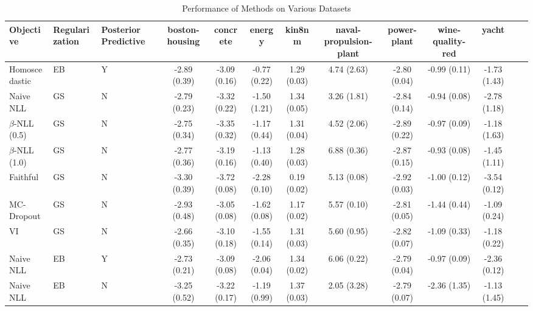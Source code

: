\begin{table}
\centering
\caption{Performance of Methods on Various Datasets}
\label{tab:results}
\begin{tabular}{|l|l|l|c|c|c|c|c|c|c|c|c|c|}
\toprule
        Objective & Regularization & Posterior Predictive & boston-housing &     concrete &       energy &      kin8nm & naval-propulsion-plant &  power-plant & wine-quality-red &        yacht \\
\midrule
    Homoscedastic &             EB &                    Y &   -2.89 (0.39) & -3.09 (0.16) & -0.77 (0.22) & 1.29 (0.03) &            4.74 (2.63) & -2.80 (0.04) &     -0.99 (0.11) & -1.73 (1.43) \\
        Naive NLL &             GS &                    N &   -2.79 (0.23) & -3.32 (0.22) & -1.50 (1.21) & 1.34 (0.05) &            3.26 (1.81) & -2.84 (0.14) &     -0.94 (0.08) & -2.78 (1.18) \\
$\beta$-NLL (0.5) &             GS &                    N &   -2.75 (0.34) & -3.35 (0.32) & -1.17 (0.44) & 1.31 (0.04) &            4.52 (2.06) & -2.89 (0.22) &     -0.97 (0.09) & -1.18 (1.63) \\
$\beta$-NLL (1.0) &             GS &                    N &   -2.77 (0.36) & -3.19 (0.16) & -1.13 (0.40) & 1.28 (0.03) &            6.88 (0.36) & -2.87 (0.15) &     -0.93 (0.08) & -1.45 (1.11) \\
         Faithful &             GS &                    N &   -3.30 (0.39) & -3.72 (0.08) & -2.28 (0.10) & 0.19 (0.02) &            5.13 (0.08) & -2.92 (0.03) &     -1.00 (0.12) & -3.54 (0.12) \\
       MC-Dropout &             GS &                    N &   -2.93 (0.48) & -3.05 (0.08) & -1.62 (0.08) & 1.17 (0.02) &            5.57 (0.10) & -2.81 (0.05) &     -1.44 (0.44) & -1.09 (0.24) \\
               VI &             GS &                    N &   -2.66 (0.35) & -3.10 (0.18) & -1.55 (0.14) & 1.31 (0.03) &            5.60 (0.95) & -2.82 (0.07) &     -1.09 (0.33) & -1.18 (0.22) \\
        Naive NLL &             EB &                    Y &   -2.73 (0.21) & -3.09 (0.08) & -2.06 (0.04) & 1.34 (0.02) &            6.06 (0.22) & -2.79 (0.04) &     -0.97 (0.09) & -2.36 (0.12) \\
        Naive NLL &             EB &                    N &   -3.25 (0.52) & -3.22 (0.17) & -1.19 (0.99) & 1.37 (0.03) &            2.05 (3.28) & -2.79 (0.07) &     -2.36 (1.35) & -1.13 (1.45) \\

\end{tabular}
\end{table}
